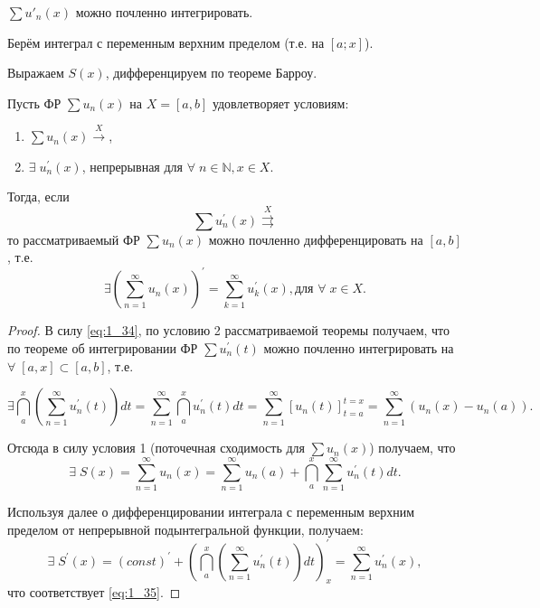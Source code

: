 \begin{plan}
\item $\sum u'_n(x)$ можно почленно интегрировать.
\item Берём интеграл с переменным верхним пределом (т.е. на $[a; x]$).
\item Выражаем $S(x)$, дифференцируем по теореме Барроу.
\end{plan}
\begin{theorem}
	Пусть ФР $\sum u_n(x)$ на $X = [a,b]$ удовлетворяет условиям:
	\begin{enumerate}
		\item $\sum u_n(x) \overset{X}{\rightarrow}$,
		\item $\exists \; u_n^{'}(x)$, непрерывная для $\forall \; n \in \mathbb{N}, x \in X$.
	\end{enumerate}
	Тогда, если
    \begin{equation}
        \label{eq:1_34}
        \sum u_n^{'}(x) \overset{X}{\rightrightarrows}
    \end{equation}
    то рассматриваемый ФР $\sum u_n(x)$ можно почленно дифференцировать на $[a,b]$, т.е.
	\begin{equation}
	\label{eq:1_35}
	\exists \left( \sum_{n=1}^{\infty} u_n (x) \right)^{'} = \sum_{k=1}^{\infty} u_k^{'}(x), \text{для }\forall \; x \in X.
	\end{equation}
\end{theorem}
\begin{proof}
	В силу \eqref{eq:1_34}, по условию 2 рассматриваемой теоремы получаем, что по теореме об интегрировании ФР $\sum u_n^{'}(t)$ можно почленно интегрировать на
    	$\forall \; [a,x] \subset [a,b]$, \nolinebreak т.е.

    \begin{equation*}
        \exists \dint\limits_a^x \left(\sum\limits_{n=1}^{\infty} u_n^{'}(t)\right)dt = \sum_{n=1}^{\infty} \dint\limits_a^x u_n^{'}(t)dt = \sum_{n=1}^{\infty} [u_n(t)]^{t = x}_{t = a} = \sum\limits_{n=1}^{\infty}\left(u_n(x) - u_n(a)\right).
    \end{equation*}

	Отсюда в силу условия 1 (поточечная сходимость для $\sum u_n(x)$) получаем, что
    \begin{equation*}
            \exists \; S(x) = \sum\limits_{n=1}^{\infty} u_n(x) = \sum\limits_{n=1}^{\infty}u_n(a) + \dint\limits_a^x \sum\limits_{n=1}^{\infty}u_n^{'}(t)dt.
    \end{equation*}

	Используя далее  о дифференцировании интеграла с переменным верхним пределом от непрерывной подынтегральной функции, получаем:\\
	\begin{equation*}
	\exists \; S^{'}(x) = (const)^{'} + \left(\dint\limits_a^x \left( \sum\limits_{n=1}^{\infty} u_n^{'} (t) \right)dt \right)^{'}_x = \sum\limits_{n=1}^{\infty}u_n^{'} (x),
	\end{equation*} что соответствует \eqref{eq:1_35}.
\end{proof}
